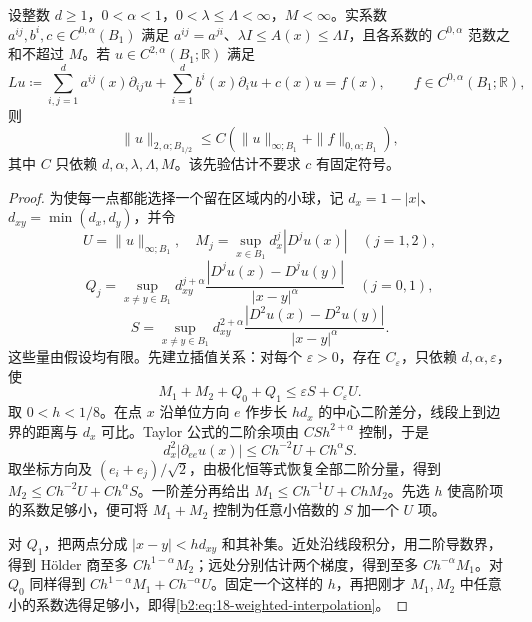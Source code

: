 \begin{theorem}
\label{b2:thm:18-variable-schauder}
设整数 \(d\ge1\)，\(0<\alpha<1\)，\(0<\lambda\le\Lambda<\infty\)，\(M<\infty\)。实系数 \(a^{ij},b^i,c\in C^{0,\alpha}(B_1)\) 满足 \(a^{ij}=a^{ji}\)、\(\lambda I\le A(x)\le\Lambda I\)，且各系数的 \(C^{0,\alpha}\) 范数之和不超过 \(M\)。若 \(u\in C^{2,\alpha}(B_1;\mathbb R)\) 满足
\[
 Lu\coloneqq\sum_{i,j=1}^d a^{ij}(x)\partial_{ij}u
      +\sum_{i=1}^d b^i(x)\partial_i u+c(x)u=f(x),
 \qquad f\in C^{0,\alpha}(B_1;\mathbb R),
\]
则
\[
 \|u\|_{2,\alpha;B_{1/2}}
 \le C\left(\|u\|_{\infty;B_1}+\|f\|_{0,\alpha;B_1}\right),
\]
其中 \(C\) 只依赖 \(d,\alpha,\lambda,\Lambda,M\)。该先验估计不要求 \(c\) 有固定符号。
\end{theorem}
\begin{proof}
为使每一点都能选择一个留在区域内的小球，记 \(d_x=1-|x|\)、\(d_{xy}=\min(d_x,d_y)\)，并令
\[
 U=\|u\|_{\infty;B_1},\quad
 M_j=\sup_{x\in B_1}d_x^j|D^ju(x)|\quad(j=1,2),
\]
\[
 Q_j=\sup_{x\ne y\in B_1}
 d_{xy}^{j+\alpha}\frac{|D^ju(x)-D^ju(y)|}{|x-y|^\alpha}
 \quad(j=0,1),
\]
\[
 S=\sup_{x\ne y\in B_1}
 d_{xy}^{2+\alpha}\frac{|D^2u(x)-D^2u(y)|}{|x-y|^\alpha}.
\]
这些量由假设均有限。先建立插值关系：对每个 \(\varepsilon>0\)，存在 \(C_\varepsilon\)，只依赖 \(d,\alpha,\varepsilon\)，使
\begin{equation}
\label{b2:eq:18-weighted-interpolation}
 M_1+M_2+Q_0+Q_1\le\varepsilon S+C_\varepsilon U.
\end{equation}
取 \(0<h<1/8\)。在点 \(x\) 沿单位方向 \(e\) 作步长 \(hd_x\) 的中心二阶差分，线段上到边界的距离与 \(d_x\) 可比。Taylor 公式的二阶余项由 \(C S h^{2+\alpha}\) 控制，于是
\[
 d_x^2|\partial_{ee}u(x)|\le C h^{-2}U+C h^\alpha S.
\]
取坐标方向及 \((e_i+e_j)/\sqrt2\)，由极化恒等式恢复全部二阶分量，得到 \(M_2\le C h^{-2}U+C h^\alpha S\)。一阶差分再给出 \(M_1\le C h^{-1}U+C hM_2\)。先选 \(h\) 使高阶项的系数足够小，便可将 \(M_1+M_2\) 控制为任意小倍数的 \(S\) 加一个 \(U\) 项。

对 \(Q_1\)，把两点分成 \(|x-y|<h d_{xy}\) 和其补集。近处沿线段积分，用二阶导数界，得到 Hölder 商至多 \(C h^{1-\alpha}M_2\)；远处分别估计两个梯度，得到至多 \(C h^{-\alpha}M_1\)。对 \(Q_0\) 同样得到 \(C h^{1-\alpha}M_1+C h^{-\alpha}U\)。固定一个这样的 \(h\)，再把刚才 \(M_1,M_2\) 中任意小的系数选得足够小，即得\eqref{b2:eq:18-weighted-interpolation}。


\end{proof}
